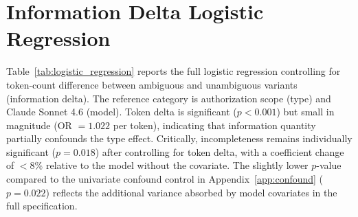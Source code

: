 \section{Information Delta Logistic Regression}
\label{app:regression}

Table~\ref{tab:logistic_regression} reports the full logistic regression controlling for token-count difference between ambiguous and unambiguous variants (information delta). The reference category is authorization scope (type) and Claude Sonnet 4.6 (model). Token delta is significant ($p < 0.001$) but small in magnitude (OR $= 1.022$ per token), indicating that information quantity partially confounds the type effect. Critically, incompleteness remains individually significant ($p = 0.018$) after controlling for token delta, with a coefficient change of $<$8\% relative to the model without the covariate. The slightly lower $p$-value compared to the univariate confound control in Appendix~\ref{app:confound} ($p = 0.022$) reflects the additional variance absorbed by model covariates in the full specification.

\begin{table}[!ht]
\centering
\small
\caption{Logistic regression predicting violation (moderate+). Reference: authorization scope, Claude Sonnet 4.6. $N = 2{,}997$, Tjur's pseudo-$R^2 = 0.175$ \citep{tjur_2009}.}
\label{tab:logistic_regression}
\end{table}

